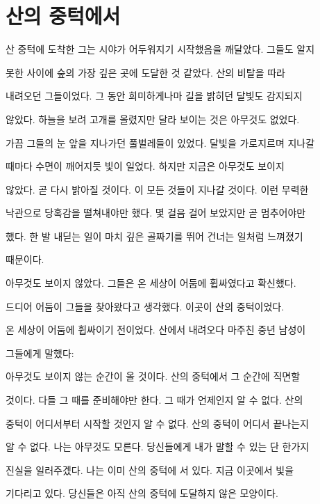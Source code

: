 \hypertarget{uxc0b0uxc758-uxc911uxd131uxc5d0uxc11c}{%

\section{산의 중턱에서}\label{uxc0b0uxc758-uxc911uxd131uxc5d0uxc11c}}



산 중턱에 도착한 그는 시야가 어두워지기 시작했음을 깨달았다. 그들도 알지

못한 사이에 숲의 가장 깊은 곳에 도달한 것 같았다. 산의 비탈을 따라

내려오던 그들이었다. 그 동안 희미하게나마 길을 밝히던 달빛도 감지되지

않았다. 하늘을 보려 고개를 올렸지만 달라 보이는 것은 아무것도 없었다.

가끔 그들의 눈 앞을 지나가던 풀벌레들이 있었다. 달빛을 가로지르며 지나갈

때마다 수면이 깨어지듯 빛이 일었다. 하지만 지금은 아무것도 보이지

않았다. 곧 다시 밝아질 것이다. 이 모든 것들이 지나갈 것이다. 이런 무력한

낙관으로 당혹감을 떨쳐내야만 했다. 몇 걸음 걸어 보았지만 곧 멈추어야만

했다. 한 발 내딛는 일이 마치 깊은 골짜기를 뛰어 건너는 일처럼 느껴졌기

때문이다.



아무것도 보이지 않았다. 그들은 온 세상이 어둠에 휩싸였다고 확신했다.

드디어 어둠이 그들을 찾아왔다고 생각했다. 이곳이 산의 중턱이었다.



온 세상이 어둠에 휩싸이기 전이었다. 산에서 내려오다 마주친 중년 남성이

그들에게 말했다:



아무것도 보이지 않는 순간이 올 것이다. 산의 중턱에서 그 순간에 직면할

것이다. 다들 그 때를 준비해야만 한다. 그 때가 언제인지 알 수 없다. 산의

중턱이 어디서부터 시작할 것인지 알 수 없다. 산의 중턱이 어디서 끝나는지

알 수 없다. 나는 아무것도 모른다. 당신들에게 내가 말할 수 있는 단 한가지

진실을 일러주겠다. 나는 이미 산의 중턱에 서 있다. 지금 이곳에서 빛을

기다리고 있다. 당신들은 아직 산의 중턱에 도달하지 않은 모양이다.



